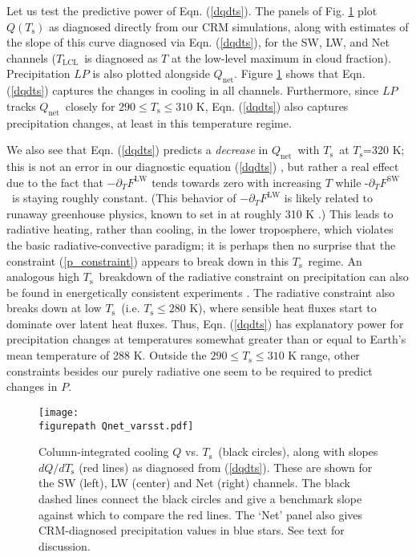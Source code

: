 \documentclass[10pt]{article}
\newcommand{\eqnref}[1]{(\ref{#1})}
\newcommand{\ppt}{\ensuremath{\partial_T}}
\newcommand{\Qnet}{\ensuremath{Q_\mathrm{net}}}
\newcommand{\FLW}{\ensuremath{F^\mathrm{LW}}}
\newcommand{\FSW}{\ensuremath{F^\mathrm{SW}}}
\newcommand{\Ts}{\ensuremath{T_\mathrm{s}}}
\newcommand{\Tlcl}{\ensuremath{T_\mathrm{LCL}}}
\newcommand{\figurepath}{../figures/}
\begin{document}
Let us test the predictive power of Eqn. \eqnref{dqdts}. The panels of Fig. \ref{Qnet_varsst} plot $Q(\Ts)$ as diagnosed directly from our CRM simulations, along with estimates of the slope of this curve diagnosed via  Eqn. \eqnref{dqdts}, for the SW, LW, and Net  channels (\Tlcl\ is diagnosed as $T$ at the low-level maximum in cloud fraction). Precipitation $LP$ is also plotted alongside $\Qnet$.  Figure \ref{Qnet_varsst} shows that  Eqn. \eqnref{dqdts}  captures the changes in  cooling in all channels. Furthermore, since $LP$ tracks \Qnet\ closely for $290\leq \Ts \leq 310$ K, Eqn. \eqnref{dqdts} also captures precipitation changes, at least in this temperature regime.

We also see that  Eqn. \eqnref{dqdts} predicts a \emph{decrease} in  \Qnet\ with \Ts\ at \Ts=320 K; this is not an error in our diagnostic equation \eqnref{dqdts} , but rather a real effect due to the fact that $-\ppt \FLW$ tends towards zero with increasing $T$  while -\ppt \FSW\ is staying roughly constant. (This behavior of $-\ppt \FLW$ is likely related to runaway greenhouse physics, known to set in at roughly 310 K \citep{goldblatt2013}.) This leads to radiative heating, rather than cooling, in the  lower troposphere, which violates the basic radiative-convective paradigm; it is perhaps then no surprise that the constraint \eqnref{p_constraint} appears to break down in this \Ts\ regime. An analogous high \Ts\ breakdown of the radiative constraint on precipitation can also be found in energetically consistent experiments \citep{lehir2009, pierrehumbert1999}.  The radiative  constraint  also breaks down at low \Ts\ (i.e. $\Ts \leq 280$ K), where sensible heat fluxes start to dominate over latent heat fluxes. Thus, Eqn. \eqnref{dqdts} has explanatory power for  precipitation changes at  temperatures somewhat greater than or equal to Earth's mean temperature of 288 K. Outside the $290\leq \Ts \leq 310$ K range, other constraints besides our purely radiative one seem to be required to predict changes in $P$.

\begin{figure}[t]
	\begin{center}
			\texttt{[image: \\figurepath Qnet\_varsst.pdf]}
		\caption{Column-integrated cooling $Q$ vs. \Ts\ (black circles), along with slopes $d Q/d \Ts$ (red lines) as diagnosed from \eqnref{dqdts}. These are shown for the SW (left), LW (center) and Net (right) channels.  The black dashed lines connect the black circles and give a benchmark slope against which to compare the red lines. The `Net' panel also gives CRM-diagnosed precipitation values in blue stars. See text for discussion.
		\label{Qnet_varsst}
		}
	\end{center}
\end{figure}
\end{document}
